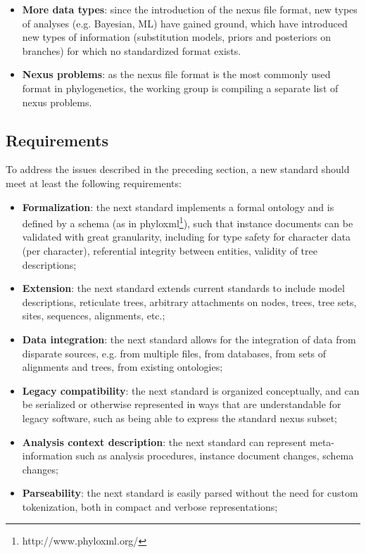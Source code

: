 \documentclass{article}
\begin{document}
\begin{itemize}
\item \textbf{More data types}: since the introduction of the nexus file
format, new types of analyses (e.g. Bayesian, ML) have gained ground,
which have introduced new types of information (substitution models,
priors and posteriors on branches) for which no standardized format
exists.

\item  \textbf{Nexus problems}: as the nexus file format is the most
commonly used format in phylogenetics, the working group is compiling a
separate list of nexus problems.

\end{itemize}

\subsection{Requirements} To address the issues described in the
preceding section, a new standard should meet at least the following
requirements:

\begin{itemize}

\item \textbf{Formalization}: the next standard implements a formal
ontology and is defined by a schema (as in
phyloxml\footnote{http://www.phyloxml.org/}), such that instance
documents can be validated with great granularity, including for type
safety for character data (per character), referential integrity between
entities, validity of tree descriptions;

\item \textbf{Extension}: the next standard extends current standards to
include model descriptions, reticulate trees, arbitrary attachments on
nodes, trees, tree sets, sites, sequences, alignments, etc.;

\item \textbf{Data integration}: the next standard allows for the
integration of data from disparate sources, e.g. from multiple files,
from databases, from sets of alignments and trees, from existing
ontologies;

\item \textbf{Legacy compatibility}: the next standard is organized
conceptually, and can be serialized or otherwise represented in ways
that are understandable for legacy software, such as being able to
express the standard nexus subset;

\item \textbf{Analysis context description}: the next standard can
represent meta-information such as analysis procedures, instance
document changes, schema changes;

\item \textbf{Parseability}: the next standard is easily parsed without
the need for custom tokenization, both in compact and verbose
representations;

\end{itemize}
\end{document}

